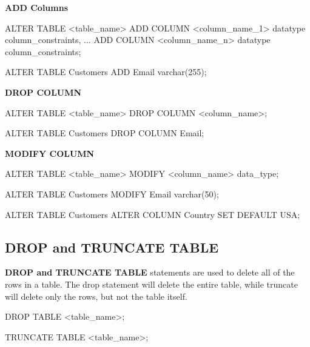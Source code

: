 \documentclass{article}
\begin{document}
\begin{large}
    \textbf{ADD Columns}
\end{large}

\begin{sqlcode}
    ALTER TABLE <table_name>
    ADD COLUMN <column_name_1> datatype column_constraints,
    ... 
    ADD COLUMN <column_name_n> datatype column_constraints;
\end{sqlcode}

\begin{sqlcode}
    ALTER TABLE Customers
    ADD Email varchar(255);
\end{sqlcode}

\begin{large}
    \textbf{DROP COLUMN}
\end{large}

\begin{sqlcode}
    ALTER TABLE <table_name>
    DROP COLUMN <column_name>;
\end{sqlcode}

\begin{sqlcode}
    ALTER TABLE Customers
    DROP COLUMN Email;
\end{sqlcode}

\begin{large}
    \textbf{MODIFY COLUMN}
\end{large}

\begin{sqlcode}
    ALTER TABLE <table_name> 
    MODIFY <column_name> data_type;
\end{sqlcode}

\begin{sqlcode}
    ALTER TABLE Customers
    MODIFY Email varchar(50);
\end{sqlcode}

\begin{sqlcode}
    ALTER TABLE Customers
    ALTER COLUMN Country SET DEFAULT USA; 
\end{sqlcode}

\subsection{DROP and TRUNCATE TABLE}

\textbf{DROP and TRUNCATE TABLE} statements are used to delete all of the rows in a table. The drop statement will delete the entire table, while truncate will delete only the rows, but not the table itself. 

\begin{sqlcode}
    DROP TABLE <table_name>;
\end{sqlcode}

\begin{sqlcode}
    TRUNCATE TABLE <table_name>;
\end{sqlcode}
\end{document}
